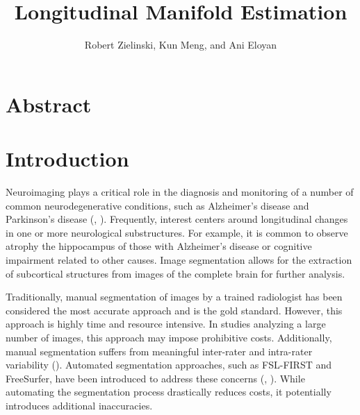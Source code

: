 \documentclass[11pt,reqno]{article}
\theoremstyle{definition}
\begin{document}
\title{Longitudinal Manifold Estimation}
\author[1]{Robert Zielinski, Kun Meng, and Ani Eloyan}


\maketitle

\doublespacing

\section*{Abstract}

\section{Introduction}

Neuroimaging plays a critical role in the diagnosis and monitoring of a number of common neurodegenerative conditions, such as Alzheimer's disease and Parkinson's disease (\cite{knopmanAlzheimerDisease2021}, \cite{poeweParkinsonDisease2017}). Frequently, interest centers around longitudinal changes in one or more neurological substructures. For example, it is common to observe atrophy the hippocampus of those with Alzheimer's disease or cognitive impairment related to other causes. Image segmentation allows for the extraction of subcortical structures from images of the complete brain for further analysis.

Traditionally, manual segmentation of images by a trained radiologist has been considered the most accurate approach and is the gold standard. However, this approach is highly time and resource intensive. In studies analyzing a large number of images, this approach may impose prohibitive costs. Additionally, manual segmentation suffers from meaningful inter-rater and intra-rater variability (\cite{boccardiSurveyProtocolsManual2011}). Automated segmentation approaches, such as FSL-FIRST and FreeSurfer, have been introduced to address these concerns (\cite{patenaudeBayesianModelShape2011}, \cite{reuterWithinsubjectTemplateEstimation2012}). While automating the segmentation process drastically reduces costs, it potentially introduces additional inaccuracies.
\end{document}
